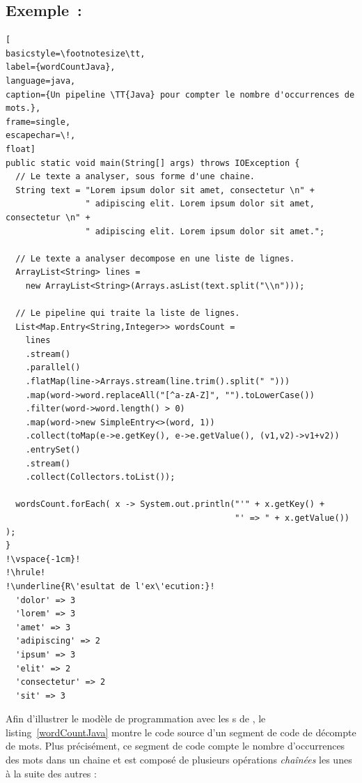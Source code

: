 \subsection{Exemple~: }


\begin{lstlisting}[
basicstyle=\footnotesize\tt,
label={wordCountJava},
language=java,
caption={Un pipeline \TT{Java} pour compter le nombre d'occurrences de mots.},
frame=single,
escapechar=\!,
float]
public static void main(String[] args) throws IOException {
  // Le texte a analyser, sous forme d'une chaine.
  String text = "Lorem ipsum dolor sit amet, consectetur \n" +
                " adipiscing elit. Lorem ipsum dolor sit amet, consectetur \n" +
                " adipiscing elit. Lorem ipsum dolor sit amet.";

  // Le texte a analyser decompose en une liste de lignes.
  ArrayList<String> lines = 
	new ArrayList<String>(Arrays.asList(text.split("\\n")));

  // Le pipeline qui traite la liste de lignes.	
  List<Map.Entry<String,Integer>> wordsCount = 
    lines
    .stream()
    .parallel()
    .flatMap(line->Arrays.stream(line.trim().split(" ")))
    .map(word->word.replaceAll("[^a-zA-Z]", "").toLowerCase())
    .filter(word->word.length() > 0)
    .map(word->new SimpleEntry<>(word, 1))
    .collect(toMap(e->e.getKey(), e->e.getValue(), (v1,v2)->v1+v2))
    .entrySet()
    .stream()
    .collect(Collectors.toList());   	
  
  wordsCount.forEach( x -> System.out.println("'" + x.getKey() + 
                                              "' => " + x.getValue()) );
}
!\vspace{-1cm}!
!\hrule!
!\underline{R\'esultat de l'ex\'ecution:}!
  'dolor' => 3
  'lorem' => 3
  'amet' => 3
  'adipiscing' => 2
  'ipsum' => 3
  'elit' => 2
  'consectetur' => 2
  'sit' => 3
\end{lstlisting}


Afin d'illustrer le mod\`ele de programmation avec les s de , le listing~\ref{wordCountJava} montre le code source d'un segment de code  de d\'ecompte de mots. Plus pr\'ecis\'ement, ce segment de code compte le nombre d'occurrences des mots dans un chaine et est compos\'e de plusieurs op\'erations \emph{cha\^in\'ees} les unes \`a la suite des autres :

